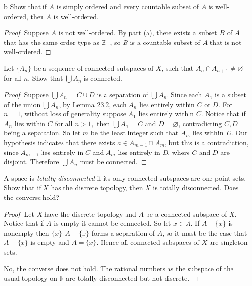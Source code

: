 \documentclass[11pt]{article}
\begin{document}
\begin{p}{b}
  Show that if $A$ is simply ordered and every countable subset of $A$ is
  well-ordered, then $A$ is well-ordered.
\end{p}

\begin{proof}
  Suppose $A$ is not well-ordered. By part (a), there exists a subset $B$ of
  $A$ that has the same order type as $\mathbb{Z}_-$, so $B$ is a countable
  subset of $A$ that is not well-ordered.
\end{proof}

\begin{ex}{23.2}
  Let $\{A_n\}$ be a sequence of connected subspaces of $X$, such that $A_n \cap
  A_{n+1} \neq \varnothing$ for all $n$. Show that $\bigcup A_n$ is connected.
\end{ex}

\begin{proof}
  Suppose $\bigcup A_n = C \cup D$ is a separation of $\bigcup A_n$. Since each
  $A_n$ is a subset of the union $\bigcup A_n$, by Lemma 23.2, each $A_n$ lies
  entirely within $C$ or $D$. For $n=1$, without loss of generality suppose
  $A_1$ lies entirely within $C$. Notice that if $A_n$ lies within $C$ for all
  $n>1,$ then $\bigcup A_n = C$ and $D = \varnothing$, contradicting $C,D$ being
  a separation. So let $m$ be the least integer such that $A_m$ lies within $D$.
  Our hypothesis indicates that there exists $a \in A_{m-1} \cap A_m$, but this
  is a contradiction, since $A_{m-1}$ lies entirely in $C$ and $A_m$ lies
  entirely in $D$, where $C$ and $D$ are disjoint. Therefore $\bigcup A_n$ must
  be connected.
\end{proof}

\begin{ex}{23.5}
  A space is \emph{totally disconnected} if its only connected subspaces are
  one-point sets. Show that if $X$ has the discrete topology, then $X$ is
  totally disconnected. Does the converse hold?
\end{ex}

\begin{proof}
  Let $X$ have the discrete topology and $A$ be a connected subspace of $X$.
  Notice that if $A$ is empty it cannot be connected. So let $x \in A$. If $A -
  \{x\}$ is nonempty then $\{x\}, A - \{x\}$ forms a separation of $A$,
  so it must be the case that $A - \{x\}$ is empty and $A = \{x\}$. Hence all
  connected subspaces of $X$ are singleton sets.

  No, the converse does not hold. The rational numbers as the subspace of the
  usual topology on $\mathbb{R}$ are totally disconnected but not discrete.
\end{proof}
\end{document}
